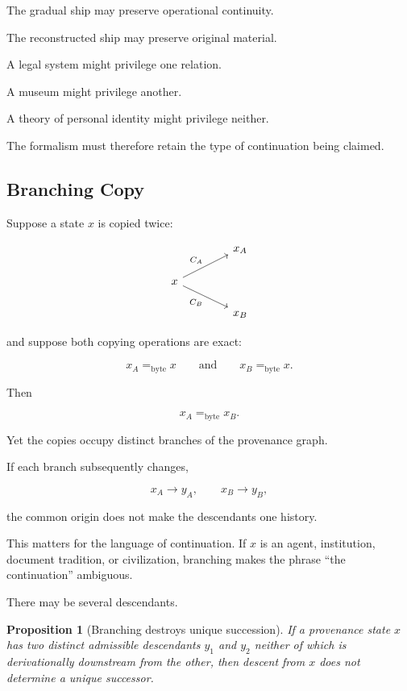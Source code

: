 \documentclass[
  11pt,
  a4paper,
  DIV=12,
  BCOR=0mm,
  parskip=half-
]{scrartcl}
\newcommand{\eqbyte}{=_{\mathrm{byte}}}
\theoremstyle{definition}
\theoremstyle{plain}
\newtheorem{proposition}[definition]{Proposition}
\theoremstyle{remark}
\begin{document}
The gradual ship may preserve operational continuity.

The reconstructed ship may preserve original material.

A legal system might privilege one relation.

A museum might privilege another.

A theory of personal identity might privilege neither.

The formalism must therefore retain the type of continuation being claimed.


\subsection{Branching Copy}
\label{sec:branching-copy}

Suppose a state \(x\) is copied twice:

\[
\begin{tikzcd}[column sep=4em,row sep=1.6em]
& x_A \\
x \arrow[ur,"C_A"] \arrow[dr,"C_B"'] & \\
& x_B
\end{tikzcd}
\]

and suppose both copying operations are exact:

\[
  x_A\eqbyte x
  \qquad\text{and}\qquad
  x_B\eqbyte x.
\]

Then

\[
  x_A\eqbyte x_B.
\]

Yet the copies occupy distinct branches of the provenance graph.

If each branch subsequently changes,

\[
  x_A\to y_A,
  \qquad
  x_B\to y_B,
\]

the common origin does not make the descendants one history.

This matters for the language of continuation. If \(x\) is an agent,
institution, document tradition, or civilization, branching makes the phrase
\enquote{the continuation} ambiguous.

There may be several descendants.

\begin{proposition}[Branching destroys unique succession]
\label{prop:branching-succession}
If a provenance state \(x\) has two distinct admissible descendants \(y_1\)
and \(y_2\) neither of which is derivationally downstream from the other, then
descent from \(x\) does not determine a unique successor.
\end{proposition}
\end{document}
